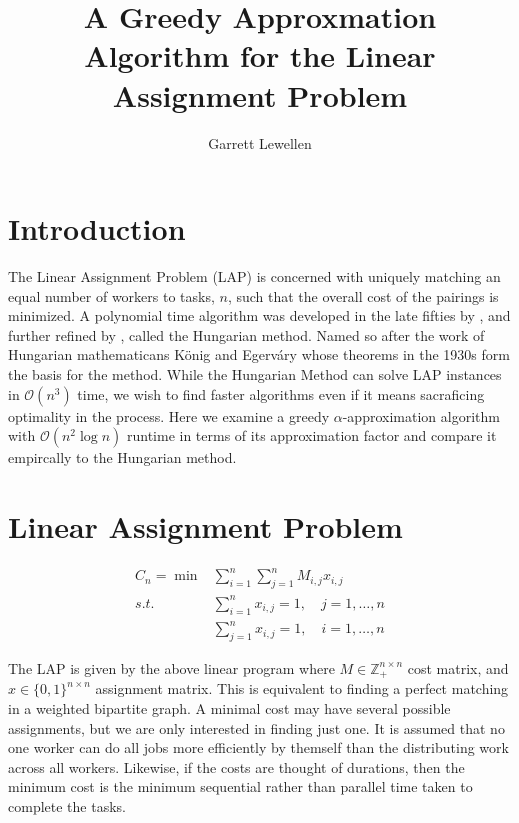 \documentclass{article}
\newcommand{\boundedBy}[1]{\mathcal{O} \left ( #1 \right )}
\begin{document}
\author{Garrett Lewellen}
\title{A Greedy Approxmation Algorithm for the Linear Assignment Problem}

\maketitle

\section{Introduction}

The Linear Assignment Problem (LAP) is concerned with uniquely matching an equal number of workers to tasks, $n$, such that the overall cost of the pairings is minimized. A polynomial time algorithm was developed in the late fifties by \cite{kuhn1955hungarian}, and further refined by \cite{munkres1957algorithms}, called the Hungarian method. Named so after the work of Hungarian mathematicans K{\"o}nig and Egerv{\'a}ry whose theorems in the 1930s form the basis for the method. While the Hungarian Method can solve LAP instances in $\boundedBy{n^3}$ time, we wish to find faster algorithms even if it means sacraficing optimality in the process. Here we examine a greedy $\alpha$-approximation algorithm with $\boundedBy{n^2 \log n}$ runtime in terms of its approximation factor and compare it empircally to the Hungarian method.

\section{Linear Assignment Problem}

\begin{equation}
\begin{aligned}
	C_n = \min & \sum_{i=1}^{n} \sum_{j=1}^{n} M_{i,j} x_{i,j} \\
	s.t. & \sum_{i=1}^{n} x_{i,j} = 1, \quad j = 1, \ldots, n \\
	& \sum_{j=1}^{n} x_{i,j} = 1, \quad i = 1, \dots, n
	\label{eqn:lap}
\end{aligned}
\end{equation}

The LAP is given by the above linear program where $M \in \mathbb{Z}_{+}^{n \times n}$ cost matrix, and $x \in \lbrace 0,1 \rbrace^{n \times n}$ assignment matrix. This is equivalent to finding a perfect matching in a weighted bipartite graph. A minimal cost may have several possible assignments, but we are only interested in finding just one. It is assumed that no one worker can do all jobs more efficiently by themself than the distributing work across all workers. Likewise, if the costs are thought of durations, then the minimum cost is the minimum sequential rather than parallel time taken to complete the tasks.
\end{document}
